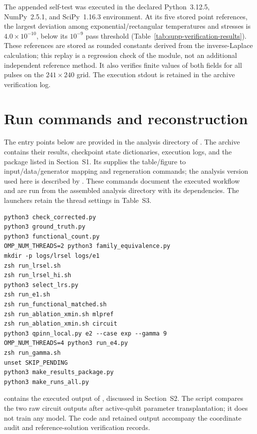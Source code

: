 \documentclass[11pt]{article}
\begin{document}
The appended  self-test was executed in the
declared Python~3.12.5, NumPy~2.5.1, and SciPy~1.16.3 environment.
At its five stored point references, the largest deviation among
exponential/rectangular temperatures and stresses is $4.0\times10^{-10}$,
below its $10^{-9}$ pass threshold (Table~\ref{tab:supp-verification-results}).
These references are stored as rounded constants derived from the
inverse-Laplace calculation; this replay is a regression check of the
module, not an additional independent reference method. It also verifies
finite values of both fields for all pulses on the $241\times240$ grid.
The execution stdout is retained in the archive verification log.

\section{Run commands and reconstruction}
\label{supp:reconstruction}

The entry points below are provided in the analysis directory of
. The archive contains their
results, checkpoint state dictionaries, execution logs, and the package
listed in Section~S1. Its  supplies the table/figure
to input/data/generator mapping and regeneration commands; the analysis
version used here is described by .
These commands document the executed workflow and are run from
the assembled analysis directory with its dependencies. The launchers
retain the thread settings in Table~S3.

\begin{verbatim}
python3 check_corrected.py
python3 ground_truth.py
python3 functional_count.py
OMP_NUM_THREADS=2 python3 family_equivalence.py
mkdir -p logs/lrsel logs/e1
zsh run_lrsel.sh
zsh run_lrsel_hi.sh
python3 select_lrs.py
zsh run_e1.sh
zsh run_functional_matched.sh
zsh run_ablation_xmin.sh mlpref
zsh run_ablation_xmin.sh circuit
python3 qpinn_local.py e2 --case exp --gamma 9
OMP_NUM_THREADS=4 python3 run_e4.py
zsh run_gamma.sh
unset SKIP_PENDING
python3 make_results_package.py
python3 make_runs_all.py
\end{verbatim}

 contains the executed output of
, discussed in Section~S2. The script compares
the two raw circuit outputs after active-qubit parameter transplantation;
it does not train any model. The code and retained output accompany the
coordinate audit and reference-solution verification records.
\end{document}
